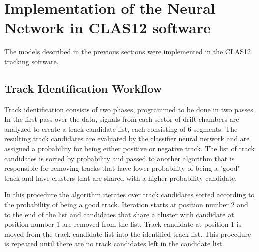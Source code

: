\section{Implementation of the Neural Network in CLAS12 software}

The models described in the previous sections were implemented in the CLAS12 tracking software. 

\subsection{Track Identification Workflow}

 Track identification consists of two phases, programmed to be done in two passes. In the first pass 
 over the data, signals from each sector of drift chambers are analyzed to create a track candidate list, 
 each consisting of 6 segments. The resulting track candidates are evaluated by the classifier neural 
 network and are assigned a probability for being either positive or negative track. The list of track 
 candidates is sorted by probability and passed to another algorithm that is responsible for removing 
 tracks that have lower probability of being a "good" track and have clusters that are shared with a 
 higher-probability candidate. 

In this procedure the algorithm iterates over track candidates sorted according to the probability of 
being a good track. Iteration starts at position number 2 and to the end of the list and candidates that 
share a cluster with candidate at position number 1 are removed from the list. Track candidate at position 
1 is moved from the track candidate list into the identified track list. This procedure is repeated until 
there are no track candidates left in the candidate list.

